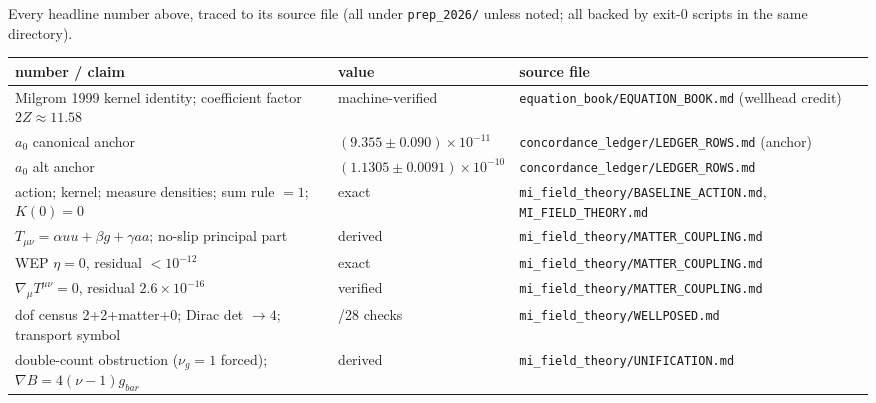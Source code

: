 \documentclass[
]{article}
\newcounter{none} %
\begin{document}
Every headline number above, traced to its source file (all under
\texttt{prep\_2026/} unless noted; all backed by exit-0 scripts in the
same directory).

{\def\LTcaptype{none} %
\begin{longtable}[]{@{}
  >{\raggedright\arraybackslash}p{}
  >{\raggedright\arraybackslash}p{}
  >{\raggedright\arraybackslash}p{}@{}}
\toprule\noalign{}
\begin{minipage}[b]{\linewidth}\raggedright
number / claim
\end{minipage} & \begin{minipage}[b]{\linewidth}\raggedright
value
\end{minipage} & \begin{minipage}[b]{\linewidth}\raggedright
source file
\end{minipage} \\
\midrule\noalign{}
\endhead
\bottomrule\noalign{}
\endlastfoot
Milgrom 1999 kernel identity; coefficient factor \(2Z \approx 11.58\) &
machine-verified & \texttt{equation\_book/EQUATION\_BOOK.md} (wellhead
credit) \\
\(a_0\) canonical anchor & \((9.355 \pm 0.090)\times 10^{-11}\) &
\texttt{concordance\_ledger/LEDGER\_ROWS.md} (anchor) \\
\(a_0\) alt anchor & \((1.1305 \pm 0.0091)\times 10^{-10}\) &
\texttt{concordance\_ledger/LEDGER\_ROWS.md} \\
action; kernel; measure densities; sum rule \(=1\); \(K(0)=0\) & exact &
\texttt{mi\_field\_theory/BASELINE\_ACTION.md},
\texttt{MI\_FIELD\_THEORY.md} \\
\(T_{\mu\nu} = \alpha uu + \beta g + \gamma aa\); no-slip principal part
& derived & \texttt{mi\_field\_theory/MATTER\_COUPLING.md} \\
WEP \(\eta = 0\), residual \(< 10^{-12}\) & exact &
\texttt{mi\_field\_theory/MATTER\_COUPLING.md} \\
\(\nabla_\mu T^{\mu\nu} = 0\), residual \(2.6 \times 10^{-16}\) &
verified & \texttt{mi\_field\_theory/MATTER\_COUPLING.md} \\
dof census 2+2+matter+0; Dirac det \(\to 4\); transport symbol & 28/28
checks & \texttt{mi\_field\_theory/WELLPOSED.md} \\
double-count obstruction (\(\nu_g = 1\) forced);
\(\nabla B = 4(\nu-1)g_{bar}\) & derived &
\texttt{mi\_field\_theory/UNIFICATION.md} \\

\end{longtable}}
\end{document}
